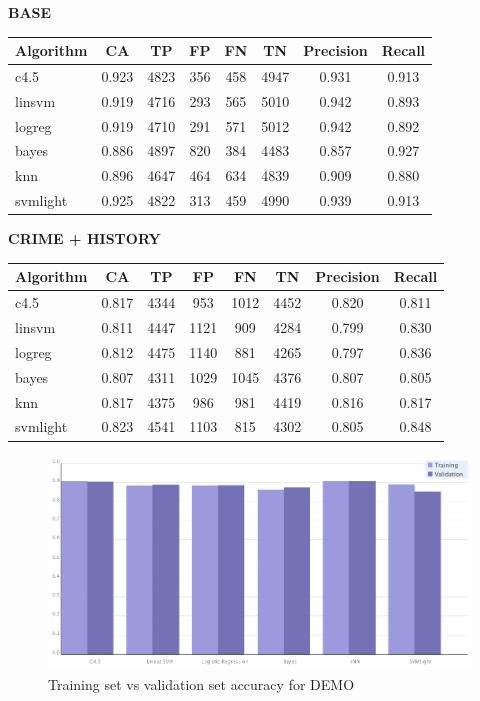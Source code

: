 \documentclass[11pt,letter]{article}
\begin{document}
\textbf{BASE} \\
\begin{tabular}{|l|c|c|c|c|c|c|c|}
\hline
Algorithm & CA & TP & FP & FN & TN & Precision & Recall\\
\hline
c4.5     & 0.923 & 4823 & 356  &  458   &  4947 & 0.931 & 0.913\\ 
linsvm   & 0.919 & 4716 & 293  &  565   &  5010 & 0.942 & 0.893\\ 
logreg   & 0.919 & 4710 & 291  &  571   &  5012 & 0.942 & 0.892\\ 
bayes    & 0.886 & 4897 & 820  &  384   &  4483 & 0.857 & 0.927\\
knn   & 0.896 & 4647 & 464  &  634   &  4839 & 0.909 & 0.880\\
svmlight & 0.925 & 4822 & 313  &  459   &  4990 & 0.939 & 0.913\\
\hline
\end{tabular}

\textbf{CRIME + HISTORY} \\
\begin{tabular}{|l|c|c|c|c|c|c|c|}
\hline
Algorithm & CA & TP & FP & FN & TN & Precision & Recall\\
\hline
c4.5     & 0.817 & 4344  & 953   & 1012 &  4452 & 0.820 & 0.811\\ 
linsvm   & 0.811 & 4447  & 1121  & 909  &  4284 & 0.799 & 0.830\\
logreg   & 0.812 & 4475  & 1140  & 881  &  4265 & 0.797 & 0.836\\ 
bayes    & 0.807 & 4311  & 1029  & 1045 &  4376 & 0.807 & 0.805\\ 
knn   & 0.817 & 4375  & 986   & 981  &  4419 & 0.816 & 0.817\\ 
svmlight & 0.823 & 4541  & 1103  & 815  &  4302 & 0.805 & 0.848\\
\hline
\end{tabular}

\begin{figure}
	\centering
	\includegraphics[scale=0.4]{report_figures/tv_accuracy_bar.png}
	\caption{Training set vs validation set accuracy for DEMO}
\end{figure}
\end{document}
